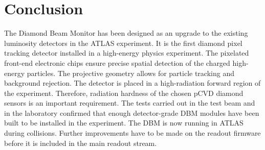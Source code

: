 \section{Conclusion}
\label{sec:limitations}
The Diamond Beam Monitor has been designed as an upgrade to the existing luminosity detectors in the ATLAS experiment. It is the first diamond pixel tracking detector installed in a high-energy physics experiment. The pixelated front-end electronic chips ensure precise spatial detection of the charged high-energy particles. The projective geometry allows for particle tracking and background rejection. The detector is placed in a high-radiation forward region of the experiment. Therefore, radiation hardness of the chosen pCVD diamond sensors is an important requirement. The tests carried out in the test beam and in the laboratory confirmed that enough detector-grade DBM modules have been built to be installed in the experiment. The DBM is now running in ATLAS during collisions. Further improvements have to be made on the readout firmware before it is included in the main readout stream. 
